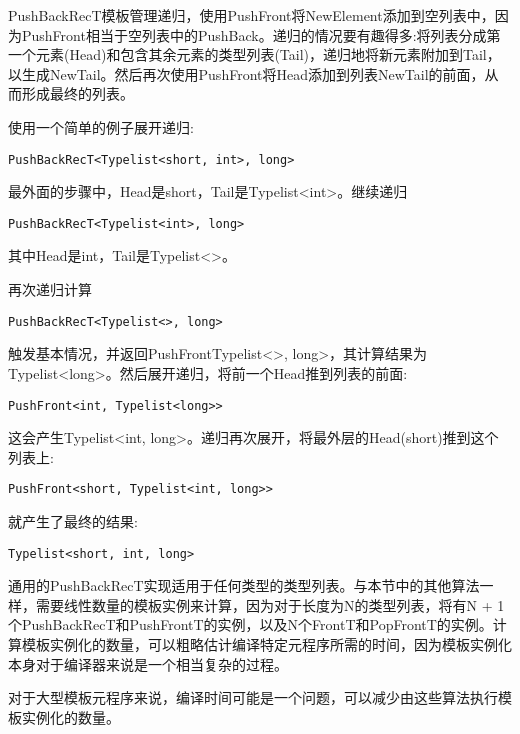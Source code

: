 PushBackRecT模板管理递归，使用PushFront将NewElement添加到空列表中，因为PushFront相当于空列表中的PushBack。递归的情况要有趣得多:将列表分成第一个元素(Head)和包含其余元素的类型列表(Tail)，递归地将新元素附加到Tail，以生成NewTail。然后再次使用PushFront将Head添加到列表NewTail的前面，从而形成最终的列表。

使用一个简单的例子展开递归:

\begin{lstlisting}[style=styleCXX]
PushBackRecT<Typelist<short, int>, long>
\end{lstlisting}

最外面的步骤中，Head是short，Tail是Typelist<int>。继续递归

\begin{lstlisting}[style=styleCXX]
PushBackRecT<Typelist<int>, long>
\end{lstlisting}

其中Head是int，Tail是Typelist<>。

再次递归计算

\begin{lstlisting}[style=styleCXX]
PushBackRecT<Typelist<>, long>
\end{lstlisting}

触发基本情况，并返回PushFrontTypelist<>, long>，其计算结果为Typelist<long>。然后展开递归，将前一个Head推到列表的前面:

\begin{lstlisting}[style=styleCXX]
PushFront<int, Typelist<long>>
\end{lstlisting}

这会产生Typelist<int, long>。递归再次展开，将最外层的Head(short)推到这个列表上:

\begin{lstlisting}[style=styleCXX]
PushFront<short, Typelist<int, long>>
\end{lstlisting}

就产生了最终的结果:

\begin{lstlisting}[style=styleCXX]
Typelist<short, int, long>
\end{lstlisting}

通用的PushBackRecT实现适用于任何类型的类型列表。与本节中的其他算法一样，需要线性数量的模板实例来计算，因为对于长度为N的类型列表，将有N + 1个PushBackRecT和PushFrontT的实例，以及N个FrontT和PopFrontT的实例。计算模板实例化的数量，可以粗略估计编译特定元程序所需的时间，因为模板实例化本身对于编译器来说是一个相当复杂的过程。

对于大型模板元程序来说，编译时间可能是一个问题，可以减少由这些算法执行模板实例化的数量。

